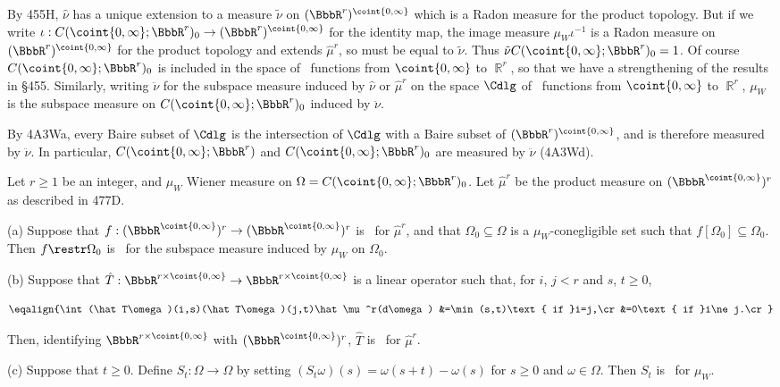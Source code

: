{By 455H, $\hat\nu$
has a unique extension to a measure $\tilde\nu$ on
$(\BbbR^r)^{\coint{0,\infty}}$ which is a Radon measure for the product
topology.   But if we write
$\iota:C(\coint{0,\infty};\BbbR^r)_0\to(\BbbR^r)^{\coint{0,\infty}}$ for
the identity map, the image measure $\mu_W\iota^{-1}$ is a Radon measure on
$(\BbbR^r)^{\coint{0,\infty}}$ for the
product topology and extends $\hat\mu^r$, so must be equal to $\tilde\nu$.
Thus $\tilde\nu C(\coint{0,\infty};\BbbR^r)_0=1$.
Of course $C(\coint{0,\infty};\BbbR^r)_0$ is included in the space of
\callal\ functions from $\coint{0,\infty}$ to $\BbbR^r$, so that we have a
strengthening of the results in \S455.   Similarly, writing $\ddot\nu$ for
the subspace measure induced by $\hat\nu$ or $\hat\mu^r$
on the space $\Cdlg$ of \cadlag\ functions from
$\coint{0,\infty}$ to $\BbbR^r$, $\mu_W$ is the subspace measure
on $C(\coint{0,\infty};\BbbR^r)_0$ induced by $\ddot\nu$.

By 4A3Wa, every Baire subset of $\Cdlg$ is the intersection of $\Cdlg$ with
a Baire subset of $(\BbbR^r)^{\coint{0,\infty}}$, and is therefore measured
by $\ddot\nu$.   In particular,
$C(\coint{0,\infty};\BbbR^r)$ and $C(\coint{0,\infty};\BbbR^r)_0$ are
measured by $\ddot\nu$ (4A3Wd).
}%

Let $r\ge 1$ be an integer, and $\mu_W$ Wiener measure on
$\Omega=C(\coint{0,\infty};\BbbR^r)_0$.
Let $\hat\mu^r$ be the product measure on
$(\BbbR^{\coint{0,\infty}})^r$ as described in 477D.

(a) Suppose that
$f:(\BbbR^{\coint{0,\infty}})^r\to(\BbbR^{\coint{0,\infty}})^r$
is \imp\ for $\hat\mu^r$, and that $\Omega_0\subseteq\Omega$ is a
$\mu_W$-conegligible set such that $f[\Omega_0]\subseteq\Omega_0$.
Then $f\restr\Omega_0$ is \imp\ for the subspace measure induced by
$\mu_W$ on $\Omega_0$.

(b) Suppose that
$\hat T:\BbbR^{r\times\coint{0,\infty}}\to\BbbR^{r\times\coint{0,\infty}}$
is a linear operator such that, for $i$, $j<r$ and $s$, $t\ge 0$,

$$\eqalign{\int(\hat T\omega)(i,s)(\hat T\omega)(j,t)\hat\mu^r(d\omega)
&=\min(s,t)\text{ if }i=j,\cr
&=0\text{ if }i\ne j.\cr}$$

\noindent Then, identifying $\BbbR^{r\times\coint{0,\infty}}$
with $(\BbbR^{\coint{0,\infty}})^r$,
$\hat T$ is \imp\ for $\hat\mu^r$.

(c) Suppose that $t\ge 0$.   Define $S_t:\Omega\to\Omega$ by setting
$(S_t\omega)(s)=\omega(s+t)-\omega(s)$ for $s\ge 0$ and $\omega\in\Omega$.
Then $S_t$ is \imp\ for $\mu_W$.

